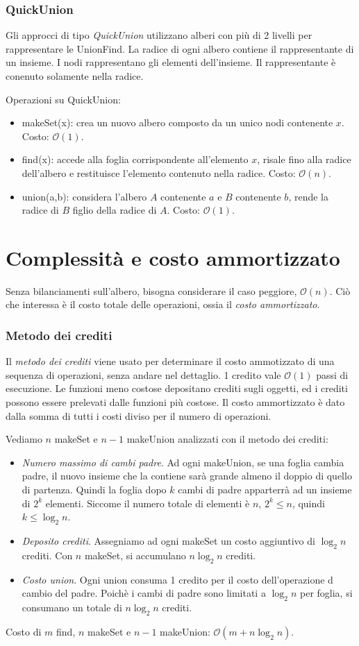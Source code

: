\documentclass[11pt]{book}
\begin{document}
\subsubsection{QuickUnion}
Gli approcci di tipo \textit{QuickUnion} utilizzano alberi con più di 2 livelli per rappresentare le UnionFind. La radice 
di ogni albero contiene il rappresentante di un insieme. I nodi rappresentano gli elementi dell'insieme. Il rappresentante 
è conenuto solamente nella radice.

Operazioni su QuickUnion:
\begin{itemize}
    \item makeSet(x): crea un nuovo albero composto da un unico nodi contenente $x$. Costo: $\mathcal{O}(1)$.
    \item find(x): accede alla foglia corrispondente all'elemento $x$, risale fino alla radice dell'albero e restituisce 
    l'elemento contenuto nella radice. Costo: $\mathcal{O}(n)$.
    \item union(a,b): considera l'albero $A$ contenente $a$ e $B$ contenente $b$, rende la radice di $B$ figlio della radice 
    di $A$. Costo: $\mathcal{O}(1)$.
\end{itemize}
\section{Complessità e costo ammortizzato}
Senza bilanciamenti sull'albero, bisogna considerare il caso peggiore, $\mathcal{O}(n)$.
Ciò che interessa è il costo totale delle operazioni, ossia il \textit{costo ammortizzato}.
\subsubsection{Metodo dei crediti}
Il \textit{metodo dei crediti} viene usato per determinare il costo ammotizzato di una sequenza di operazioni, senza andare 
nel dettaglio. 1 credito vale $\mathcal{O}(1)$ passi di esecuzione. Le funzioni meno costose depositano crediti sugli oggetti,
ed i crediti possono essere prelevati dalle funzioni più costose. Il costo ammortizzato è dato dalla somma di tutti i costi 
diviso per il numero di operazioni.

Vediamo $n$ makeSet e $n-1$ makeUnion analizzati con il metodo dei crediti:
\begin{itemize}
    \item \textit{Numero massimo di cambi padre}. Ad ogni makeUnion, se una foglia cambia padre, il nuovo insieme che la
    contiene sarà grande almeno il doppio di quello di partenza. Quindi la foglia dopo $k$ cambi di padre apparterrà ad 
    un insieme di $2^k$ elementi. Siccome il numero totale di elementi è $n$, $2^k\leq n$, quindi $k\leq \log_2n$.
    \item \textit{Deposito crediti}. Assegniamo ad ogni makeSet un costo aggiuntivo di $\log_2n$ crediti. Con $n$ makeSet, 
    si accumulano $n\log_2n$ crediti.
    \item \textit{Costo union}. Ogni union consuma 1 credito per il costo dell'operazione d cambio del padre. Poichè i cambi 
    di padre sono limitati a $\log_2n$ per foglia, si consumano un totale di $n\log_2n$ crediti.
\end{itemize}
Costo di $m$ find, $n$ makeSet e $n-1$ makeUnion: $\mathcal{O}(m+n\log_2n)$.
\end{document}
